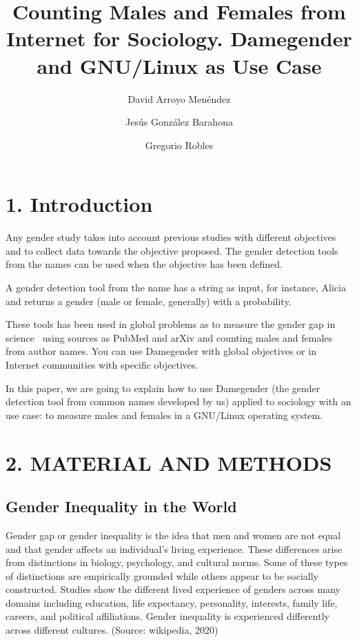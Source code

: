 \documentclass[fleqn,10pt,lineno]{wlpeerj} %
\title{Counting Males and Females from Internet for Sociology. Damegender and GNU/Linux as Use Case}
\author[1]{David Arroyo Menéndez}
\affil[1]{Universidad Rey Juan Carlos}
\author[2]{Jesús González Barahona}
\affil[2]{Universidad Rey Juan Carlos}
\author[3]{Gregorio Robles}
\affil[3]{Universidad Rey Juan Carlos}
\begin{document}
\flushbottom
\maketitle
\thispagestyle{empty}

\section*{1. Introduction}
Any gender study takes into account previous studies with different
objectives and to collect data towards the objective proposed. The
gender detection tools from the names can be used when the objective
has been defined.

A gender detection tool from the name has a string as input, for
instance, Alicia and returns a gender (male or female, generally) with
a probability.

These tools has been used in global problems as to measure the gender
gap in science~\cite{holman2018gender} using sources as PubMed and
arXiv and counting males and females from author names. You can use
Damegender with global objectives or in Internet communities with
specific objectives.

In this paper, we are going to explain how to use Damegender (the
gender detection tool from common names developed by us) applied to
sociology with an use case: to measure males and females in a
GNU/Linux operating system.

\section*{2. MATERIAL AND METHODS}

\subsection*{Gender Inequality in the World}

Gender gap or gender inequality is the idea that men and women are not
equal and that gender affects an individual's living experience. These
differences arise from distinctions in biology, psychology, and
cultural norms. Some of these types of distinctions are empirically
grounded while others appear to be socially constructed. Studies show
the different lived experience of genders across many domains
including education, life expectancy, personality, interests, family
life, careers, and political affiliations. Gender inequality is
experienced differently across different cultures. (Source: wikipedia,
2020)
\end{document}
